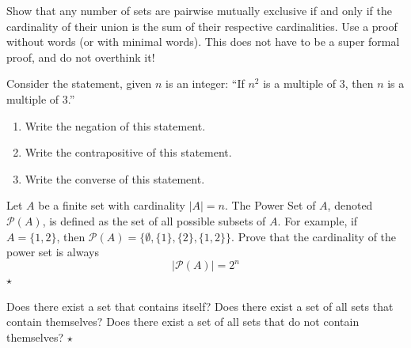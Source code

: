 \begin{problem}
   Show that any number of sets are pairwise mutually exclusive if and only if the cardinality of their union is the sum of their respective cardinalities. Use a proof without words (or with minimal words). This does not have to be a super formal proof, and do not overthink it!
\end{problem}

\begin{problem}
Consider the statement, given $n$ is an integer: ``If  $n^2$ is a multiple of 3, then $n$ is a multiple of 3.''
\begin{enumerate}
    \item Write the negation of this statement.
    \item Write the contrapositive of this statement.
    \item Write the converse of this statement.
\end{enumerate}
\end{problem}

\begin{problem}
Let $A$ be a finite set with cardinality $|A| = n$. The Power Set of $A$, denoted $\mathcal{P}(A)$, is defined as the set of all possible subsets of $A$. For example, if $A = \{1, 2\}$, then $\mathcal{P}(A) = \{\emptyset, \{1\}, \{2\}, \{1, 2\}\}$. Prove that the cardinality of the power set is always 
\[
|\mathcal{P}(A)| = 2^n
\]
\hfill $\star$
\end{problem}

\begin{problem}
   Does there exist a set that contains itself? Does there exist a set of all sets that contain themselves? Does there exist a set of all sets that do not contain themselves? \hfill $\star$
\end{problem}